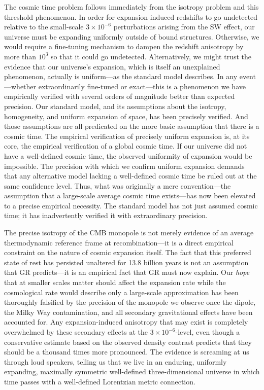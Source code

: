\documentclass[aps,prd,reprint,superscriptaddress]{revtex4-2}
\begin{document}
The cosmic time problem follows immediately from the isotropy problem and this threshold phenomenon. In order for expansion-induced redshifts to go undetected relative to the small-scale $3\times10^{-6}$ perturbations arising from the SW effect, our universe must be expanding uniformly outside of bound structures. Otherwise, we would require a fine-tuning mechanism to dampen the redshift anisotropy by more than $10^3$ so that it could go undetected. Alternatively, we might trust the evidence that our universe's expansion, which is itself an unexplained phenomenon, actually is uniform---as the standard model describes. In any event---whether extraordinarily fine-tuned or exact---this is a phenomenon we have empirically verified with several orders of magnitude better than expected precision. Our standard model, and its assumptions about the isotropy, homogeneity, and uniform expansion of space, has been precisely verified. And those assumptions are all predicated on the more basic assumption that there is a cosmic time. The empirical verification of precisely uniform expansion is, at its core, the empirical verification of a global cosmic time. If our universe did not have a well-defined cosmic time, the observed uniformity of expansion would be impossible. The precision with which we confirm uniform expansion demands that any alternative model lacking a well-defined cosmic time be ruled out at the same confidence level. Thus, what was originally a mere convention---the assumption that a large-scale average cosmic time exists---has now been elevated to a precise empirical necessity. The standard model has not just assumed cosmic time; it has inadvertently verified it with extraordinary precision.

The precise isotropy of the CMB monopole is not merely evidence of an average thermodynamic reference frame at recombination---it is a direct empirical constraint on the nature of cosmic expansion itself. The fact that this preferred state of rest has persisted unaltered for 13.8 billion years is not an assumption that GR predicts---it is an empirical fact that GR must now explain. Our \textit{hope} that at smaller scales matter should affect the expansion rate while the cosmological rate would describe only a large-scale approximation has been thoroughly falsified by the precision of the monopole we observe once the dipole, the Milky Way contamination, and all secondary gravitational effects have been accounted for. Any expansion-induced anisotropy that may exist is completely overwhelmed by these secondary effects at the $3\times10^{-6}$-level, even though a conservative estimate based on the observed density contrast predicts that they should be a thousand times more pronounced. The evidence is screaming at us through loud speakers, telling us that we live in an enduring, uniformly expanding, maximally symmetric well-defined three-dimensional universe in which time passes with a well-defined Lorentzian metric connection.
\end{document}
